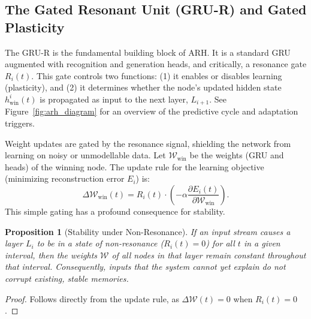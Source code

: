\documentclass{article}
\newtheorem{proposition}[theorem]{Proposition}
\numberwithin{figure}{section}
\numberwithin{table}{section}
\numberwithin{algorithm}{section}
\begin{document}
\subsection{The Gated Resonant Unit (GRU-R) and Gated Plasticity}
The GRU-R is the fundamental building block of ARH. It is a standard GRU \citep{Cho2014} augmented with recognition and generation heads, and critically, a resonance gate $R_i(t)$. This gate controls two functions: (1) it enables or disables learning (plasticity), and (2) it determines whether the node's updated hidden state $h_{\text{win}}^i(t)$ is propagated as input to the next layer, $L_{i+1}$. See Figure~\ref{fig:arh_diagram} for an overview of the predictive cycle and adaptation triggers.

Weight updates are gated by the resonance signal, shielding the network from learning on noisy or unmodellable data. Let $\mathcal{W}_{\text{win}}$ be the weights (GRU and heads) of the winning node. The update rule for the learning objective (minimizing reconstruction error $E_i$) is:
\begin{equation}
    \Delta \mathcal{W}_{\text{win}}(t) = R_i(t) \cdot \left(-\alpha \frac{\partial E_i(t)}{\partial \mathcal{W}_{\text{win}}}\right).
\end{equation}
This simple gating has a profound consequence for stability.

\begin{proposition}[Stability under Non-Resonance]
If an input stream causes a layer $L_i$ to be in a state of non-resonance ($R_i(t)=0$) for all $t$ in a given interval, then the weights $\mathcal{W}$ of all nodes in that layer remain constant throughout that interval. Consequently, inputs that the system cannot yet explain do not corrupt existing, stable memories.
\end{proposition}
\begin{proof}
Follows directly from the update rule, as $\Delta\mathcal{W}(t)=0$ when $R_i(t)=0$.
\end{proof}
\end{document}

